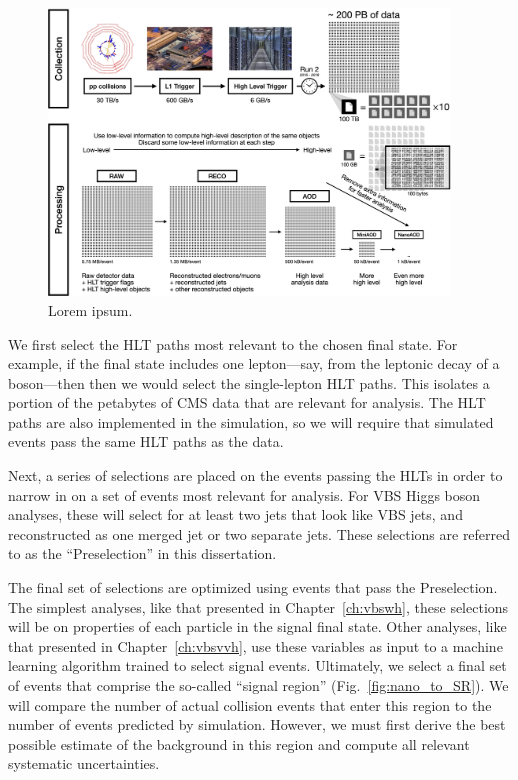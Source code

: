 \begin{figure}[htb]
    \centering
    \includegraphics[width=0.95\textwidth]{fig/cms/pp_to_nano.png}
    \caption{
        Lorem ipsum.
    }
    \label{fig:pp_to_nano}
\end{figure}

We first select the HLT paths most relevant to the chosen final state. 
For example, if the final state includes one lepton---say, from the leptonic decay of a \PW boson---then then we would select the single-lepton HLT paths. 
This isolates a portion of the petabytes of CMS data that are relevant for analysis. 
The HLT paths are also implemented in the simulation, so we will require that simulated events pass the same HLT paths as the data. 

Next, a series of selections are placed on the events passing the HLTs in order to narrow in on a set of events most relevant for analysis. 
For VBS Higgs boson analyses, these will select for at least two jets that look like VBS jets, and \Htobb reconstructed as one merged jet or two separate jets. 
These selections are referred to as the ``Preselection'' in this dissertation. 

The final set of selections are optimized using events that pass the Preselection. 
The simplest analyses, like that presented in Chapter~\ref{ch:vbswh}, these selections will be on properties of each particle in the signal final state. 
Other analyses, like that presented in Chapter~\ref{ch:vbsvvh}, use these variables as input to a machine learning algorithm trained to select signal events. 
Ultimately, we select a final set of events that comprise the so-called ``signal region'' (Fig.~\ref{fig:nano_to_SR}). 
We will compare the number of actual collision events that enter this region to the number of events predicted by simulation. 
However, we must first derive the best possible estimate of the background in this region and compute all relevant systematic uncertainties. 

